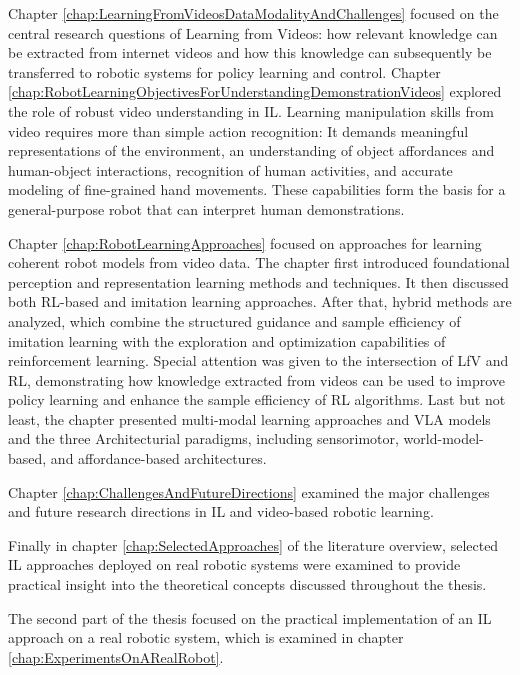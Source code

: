 Chapter \ref{chap:LearningFromVideosDataModalityAndChallenges} focused on the central research questions of Learning from Videos: how relevant knowledge can be extracted from internet videos and how this knowledge can subsequently be transferred to robotic systems for policy learning and control. 
Chapter \ref{chap:RobotLearningObjectivesForUnderstandingDemonstrationVideos} explored the role of robust video understanding in \ac{IL}. Learning manipulation skills from video requires more than simple action recognition: It demands meaningful representations of the environment, an understanding of object affordances and human-object interactions, recognition of human activities, and accurate modeling of fine-grained hand movements.
These capabilities form the basis for a general-purpose robot that can interpret human demonstrations.




Chapter \ref{chap:RobotLearningApproaches} focused on approaches for learning coherent robot models from video data. 
The chapter first introduced foundational perception and representation learning methods and techniques. 
It then discussed both RL-based and imitation learning approaches.
After that, hybrid methods are analyzed, which combine the structured guidance and sample efficiency of imitation learning with the exploration and optimization capabilities of reinforcement learning. Special attention was given to the intersection of \acf{LfV} and \acf{RL}, demonstrating how knowledge extracted from videos can be used to improve policy learning and enhance the sample efficiency of RL algorithms.
Last but not least, the chapter presented multi-modal learning approaches and \acf{VLA} models and the three Architecturial paradigms, including sensorimotor, world-model-based, and affordance-based architectures. 

Chapter \ref{chap:ChallengesAndFutureDirections} examined the major challenges and future research directions in \ac{IL} and video-based robotic learning. 


Finally in chapter \ref{chap:SelectedApproaches} of the literature overview, selected \ac{IL} approaches deployed on real robotic systems were examined to provide practical insight into the theoretical concepts discussed throughout the thesis. 

The second part of the thesis focused on the practical implementation of an \ac{IL} approach on a real robotic system, which is examined in chapter \ref{chap:ExperimentsOnARealRobot}.